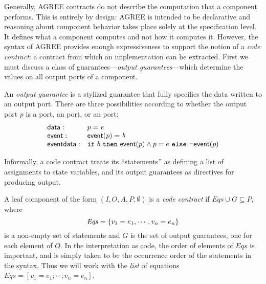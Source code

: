 

Generally, AGREE contracts do not describe the computation that a
component performs. This is entirely by design: AGREE is intended to
be declarative and reasoning about component behavior takes place
solely at the specification level. It defines what a component
computes and not how it computes it. However, the syntax of AGREE
provides enough expressiveness to support the notion of a \emph{code
contract}: a contract from which an implementation can be
extracted. First we must discuss a class of guarantees---\emph{output
guarantees}---which determine the values on all output ports of a
component.

\begin{definition}
An \emph{output guarantee} is a stylized guarantee that fully
specifies the data written to an output port. There are three
possibilities according to whether the output port $p$ is
a  port, an  port, or an 
port:
\[
\begin{array}{ll}
\mathsf{data}: &  p = \mathit{e} \\
\mathsf{event}: &  \mathsf{event} (p) = \mathit{b} \\
\mathsf{event data}: & \mbox{$\mathtt{if}\ {b}\ \mathtt{then}\ {\mathsf{event} (p) \land p = e}\ \mathtt{else}\ {\neg \mathsf{event}(p)}$} \\
\end{array}
\]
\end{definition}

Informally, a code contract treats its  ``statements'' as
defining a list of assignments to state variables, and its output
guarantees as directives for producing output.

\begin{definition} A
  leaf component of the form $(I,O,A,P,\emptyset)$ is a
  \emph{code contract} if $\mathit{Eqs} \cup G \subseteq P$, where
\[\mathit{Eqs} = \{ {v_1 = e_1, \cdots , v_n = e_n} \} \] is a non-empty set
of  statements and $G$ is the set of output guarantees, one for
each element of $O$. In the interpretation as code, the order of
elements of $\mathit{Eqs}$ is important, and is simply taken to be the
occurrence order of the  statements in the syntax. Thus we
will work with the
\emph{list} of equations $\mathit{Eqs} = [v_1 = e_1; \cdots ; v_n = e_n]$.
\end{definition}



